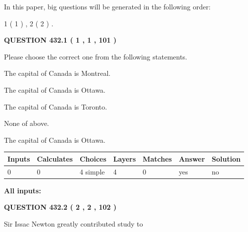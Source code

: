 \documentclass[12pt]{article}
\begin{document}
In this paper, big questions will be generated in the following order: 
   
   
   1 ( 1 )
 ,
   2 ( 2 )
 .
  
\vspace{0.2in}
  
{\textbf{\Large{QUESTION
432.1 
 ( 1 , 1 , 101 )
}}}
  
  
Please choose the correct one from the following statements.
 
 
The capital of Canada is Montreal.
 
 
The capital of Canada is Ottawa.
 
 
The capital of Canada is Toronto.
 
 
 None of above.
 
 
\noindent{}
 
 
The capital of Canada is Ottawa.
 
 
\noindent{}
 
 
   
   
   
   
\noindent\begin{tabular}{|l|l|l|l|l|l|l|}
 \hline
Inputs & Calculates & Choices & Layers & Matches & Answer & Solution \\ \hline
 0  & 
 0  & 
 4
  simple  
  & 
 4  & 
 0  & 
  yes & 
  no 
  \\ \hline
 \end{tabular}
   
   
   
   
\noindent{}
   
   
   
   
\noindent\vspace{0.1in}\hspace{-0.08in} {\textbf{\Large{All inputs: }}}
   
   
  
\vspace{0.2in}
  
{\textbf{\Large{QUESTION
432.2 
 ( 2 , 2 , 102 )
}}}
  
  
Sir Issac Newton greatly contributed study to
 
\end{document}
